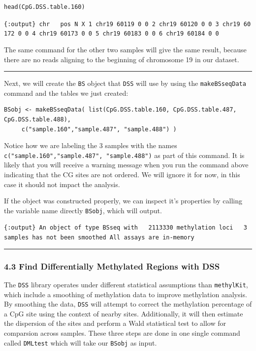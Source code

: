 \documentclass[
]{book}
\begin{document}
\begin{verbatim}
head(CpG.DSS.table.160)
\end{verbatim}

\texttt{\{:output\}\ chr\ \ \ pos\ N\ X\ 1\ chr19\ 60119\ 0\ 0\ 2\ chr19\ 60120\ 0\ 0\ 3\ chr19\ 60172\ 0\ 0\ 4\ chr19\ 60173\ 0\ 0\ 5\ chr19\ 60183\ 0\ 0\ 6\ chr19\ 60184\ 0\ 0}

The same command for the other two samples will give the same result, because there are no reads aligning to the beginning of chromosome 19 in our dataset.

\begin{center}\rule{0.5\linewidth}{0.5pt}\end{center}

Next, we will create the \texttt{BS} object that \texttt{DSS} will use by using the \texttt{makeBSseqData} command and the tables we just created:

\begin{verbatim}
BSobj <- makeBSseqData( list(CpG.DSS.table.160, CpG.DSS.table.487, CpG.DSS.table.488),
     c("sample.160","sample.487", "sample.488") )
\end{verbatim}

Notice how we are labeling the 3 samples with the names \texttt{c("sample.160","sample.487",\ "sample.488")} as part of this command. It is likely that you will receive a warning message when you run the command above indicating that the CG sites are not ordered. We will ignore it for now, in this case it should not impact the analysis.

If the object was constructed properly, we can inspect it's properties by calling the variable name directly \texttt{BSobj}, which will output.

\texttt{\{:output\}\ An\ object\ of\ type\ \textquotesingle{}BSseq\textquotesingle{}\ with\ \ \ 2113330\ methylation\ loci\ \ \ 3\ samples\ has\ not\ been\ smoothed\ All\ assays\ are\ in-memory}

\begin{center}\rule{0.5\linewidth}{0.5pt}\end{center}

\subsubsection{4.3 Find Differentially Methylated Regions with DSS}\label{find-differentially-methylated-regions-with-dss}

The \texttt{DSS} library operates under different statistical assumptions than \texttt{methylKit}, which include a smoothing of methylation data to improve methylation analysis. By smoothing the data, \texttt{DSS} will attempt to correct the methylation percentage of a CpG site using the context of nearby sites. Additionally, it will then estimate the dispersion of the sites and perform a Wald statistical test to allow for comparsion across samples. These three steps are done in one single command called \texttt{DMLtest} which will take our \texttt{BSobj} as input.
\end{document}
